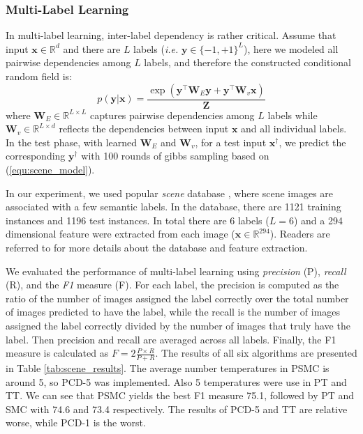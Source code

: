 \subsubsection{Multi-Label Learning}
In multi-label learning, inter-label dependency is rather critical. Assume that input $\mathbf{x}\in \mathbb{R}^d$ and there are $L$ labels (\emph{i.e.} $\mathbf{y}\in\{-1,+1\}^L$), here we modeled all pairwise dependencies among $L$ labels, and therefore 
the constructed conditional random field is:
\begin{equation}
	p(\mathbf{y}|\mathbf{x})=\frac{\exp(\mathbf{y}^\top\mathbf{W}_E \mathbf{y}+\mathbf{y}^\top \mathbf{W}_v \mathbf{x})}{\mathbf{Z}}
	\label{equ:scene_model}
\end{equation}
where $\mathbf{W}_E\in \mathbb{R}^{L\times L}$ captures pairwise dependencies among $L$ labels while $\mathbf{W}_v\in \mathbb{R}^{L\times d}$ reflects the 
dependencies between input $\mathbf{x}$ and all individual labels.   
In the test phase, with learned $\mathbf{W}_E$ and $\mathbf{W}_v$, for a test input $\mathbf{x}^\dagger$, we predict the corresponding $\mathbf{y}^\dagger$ with 
100 rounds of gibbs sampling based on (\ref{equ:scene_model}).  

In our experiment, we used popular \emph{scene} database \citep{scene_database}, where scene images are associated with a few semantic labels. In the database, 
there are 1121 training instances and 1196 test instances.  In total there are 6 labels ($L=6$) and a 294 dimensional feature were extracted from each image         
($\mathbf{x}\in\mathbb{R}^{294}$). Readers are referred to \cite{scene_database} for more details about the database and feature extraction.  

We evaluated the performance of multi-label learning using \emph{precision} (P), \emph{recall} (R), and the \emph{F1} measure (F). For each label, the precision is 
computed as the ratio of the number of images assigned the label correctly over the total number of images predicted to have the label, while the recall is the number of images 
assigned the label correctly divided by the number of images that truly have the label. Then precision and recall are averaged across all labels. Finally, the F1 measure is calculated as 
$F=2\frac{P\times R}{P+R}$.
The results of all six algorithms are presented in Table \ref{tab:scene_results}.     
The average number temperatures in PSMC is around 5, so PCD-5 was implemented. Also 5 temperatures were use in PT and TT.    
We can see that PSMC yields the best F1 measure 75.1, followed by PT and SMC with 74.6 and 73.4 respectively. The results of PCD-5 and TT             
are relative worse, while PCD-1 is the worst.  


